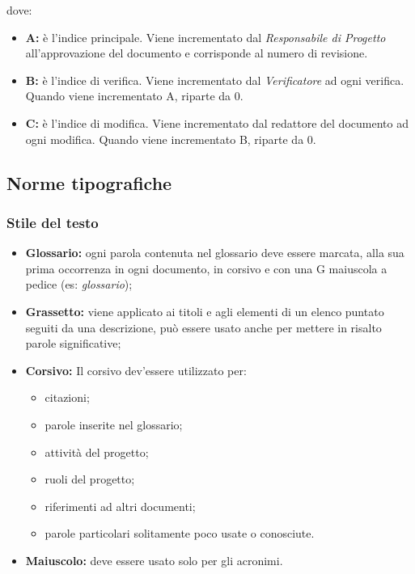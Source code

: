 \documentclass[./../NormediProgetto.tex]{subfiles}
\begin{document}
dove:

\begin{itemize}

\item{\textbf{A:}} è l'indice principale. Viene incrementato dal \textit{Responsabile di Progetto} all’approvazione del documento e 
corrisponde al numero di revisione.

\item{\textbf{B:}} è l'indice di verifica. Viene incrementato dal \textit{Verificatore} ad ogni verifica. Quando viene incrementato A, riparte da 0.

\item{\textbf{C:}} è l'indice di modifica. Viene incrementato dal redattore del documento ad ogni modifica. Quando viene incrementato B, riparte da 0.

\end{itemize}

\subsection{Norme tipografiche}

\subsubsection{Stile del testo}

\begin{itemize}

\item{\textbf{Glossario:}} ogni parola contenuta nel glossario deve essere marcata, alla sua prima occorrenza in ogni documento, in corsivo e con una G maiuscola a pedice (es: \textit{glossario});  

\item{\textbf{Grassetto:}} viene applicato ai titoli e agli elementi di un elenco puntato seguiti da una descrizione, può essere usato anche per mettere in risalto parole significative; 

\item{\textbf{Corsivo:}} Il corsivo dev’essere utilizzato per:
\begin{itemize}
\item citazioni;
\item parole inserite nel glossario;
\item attività del progetto;
\item ruoli del progetto;
\item riferimenti ad altri documenti;
\item parole particolari solitamente poco usate o conosciute.
\end{itemize}

\item{\textbf{Maiuscolo:}} deve essere usato solo per gli acronimi.

\end{itemize}
\end{document}
